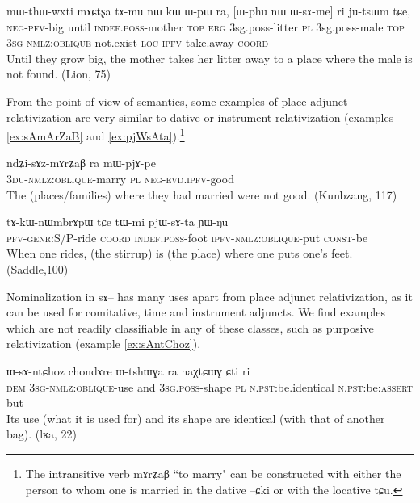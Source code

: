\documentclass[oldfontcommands,oneside,a4paper,11pt]{article}
\newcommand{\ipa}[1]{{\phon #1}} %
\begin{document}
\begin{exe}
   \ex \label{ex:WsAme}
 \gll
\ipa{mɯ-thɯ-wxti}   	\ipa{mɤɕtʂa}   	\ipa{tɤ-mu}   	\ipa{nɯ}   	\ipa{kɯ}   	\ipa{ɯ-pɯ}   	\ipa{ra,}   	[\ipa{ɯ-phu}   	\ipa{nɯ}   	\ipa{ɯ-sɤ-me}]   	\ipa{ri}   	\ipa{ju-tsɯm}   	\ipa{tɕe,}   \\
\textsc{neg-pfv}-big until \textsc{indef.poss}-mother \textsc{top} \textsc{erg}  {3sg.poss}-litter \textsc{pl}  {3sg.poss}-male \textsc{top} \textsc{3sg-nmlz:oblique}-not.exist  \textsc{loc} \textsc{ipfv}-take.away \textsc{coord} \\
\glt  Until they grow big, the mother takes her litter away to a place where the male is not found. (Lion, 75)
  \end{exe}
From the point of view of semantics, some examples of place adjunct relativization are very similar to dative or instrument relativization (examples \ref{ex:sAmArZaB} and  \ref{ex:pjWsAta}).\footnote{The intransitive verb \ipa{mɤrʑaβ} ``to marry" can be constructed with either the person to whom one is married in the dative \ipa{--ɕki} or with the locative \ipa{tɕu}. }



\begin{exe}
   \ex \label{ex:sAmArZaB}
 \gll
	\ipa{ndʑi-sɤz-mɤrʑaβ}   	\ipa{ra}   	\ipa{mɯ-pjɤ-pe}   \\
\textsc{3du-nmlz:oblique}-marry \textsc{pl} \textsc{neg-evd.ipfv}-good \\
\glt The (places/families) where they had married were not good. (Kunbzang, 117)
\end{exe}

\begin{exe}
   \ex \label{ex:pjWsAta}
 \gll
\ipa{tɤ-kɯ-nɯmbrɤpɯ}   	\ipa{tɕe}   	\ipa{tɯ-mi}   	\ipa{pjɯ-sɤ-ta}   	\ipa{ɲɯ-ŋu}   \\
\textsc{pfv-genr:S/P}-ride \textsc{coord}  \textsc{indef.poss}-foot \textsc{ipfv-nmlz:oblique}-put \textsc{const}-be \\
\glt When one rides, (the stirrup) is (the place) where one puts one's feet. (Saddle,100)
\end{exe}


Nominalization in \ipa{sɤ}-- has many uses apart from place adjunct relativization, as it can be used for comitative, time and instrument adjuncts. We find examples which are not readily classifiable in any of these classes, such as purposive relativization (example \ref{ex:sAntChoz}).  

     \begin{exe}
  \ex   \label{ex:sAntChoz}  
\gll \ipa{nɯnɯ}  	\ipa{ɯ-sɤ-ntɕhoz}  	\ipa{chondɤre}  	\ipa{ɯ-tshɯɣa}  	\ipa{ra}  	\ipa{naχtɕɯɣ}  	\ipa{ɕti}  	\ipa{ri}  	\\
\textsc{dem} \textsc{3sg-nmlz:oblique}-use and \textsc{3sg.poss}-shape \textsc{pl} \textsc{n.pst}:be.identical \textsc{n.pst}:be:\textsc{assert} but \\
\glt  Its use (what it is used for) and its shape are identical (with that of another bag). (lʁa, 22)
   \end{exe} 
\end{document}
